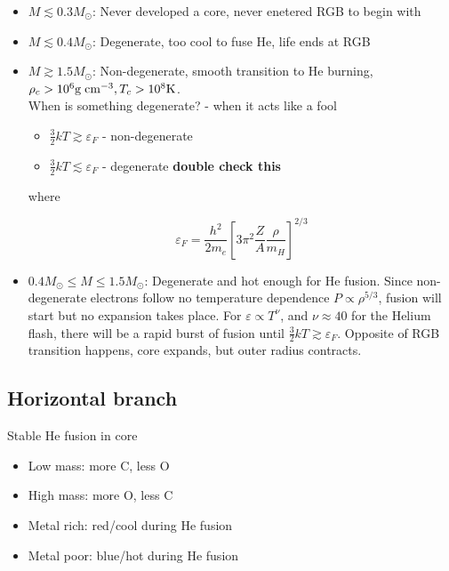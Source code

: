 \documentclass{article}
\begin{document}
\begin{itemize}
    \item $M \lesssim 0.3M_\odot$: Never developed a core, never enetered RGB to begin with
    \item $M \lesssim 0.4M_\odot$: Degenerate, too cool to fuse He, life ends at RGB
    \item $M \gtrsim 1.5M_\odot$: Non-degenerate, smooth transition to He burning, $\rho_c > 10^6 {\rm g\; cm^{-3}}, T_c > 10^8{\rm K}$.\\

    When is something degenerate? - when it acts like a fool\\

    \begin{itemize}
        \item $\frac{3}{2}kT \gtrsim \varepsilon_F$ - non-degenerate
        \item $\frac{3}{2}kT \lesssim \varepsilon_F$ - degenerate \textbf{double check this}
    \end{itemize}

    where 

    \begin{equation}
        \varepsilon_F = \frac{h^2}{2m_e}\left[3\pi^2\frac{Z}{A}\frac{\rho}{m_H}\right]^{2/3}
    \end{equation}

    \item $0.4M_\odot \leq M \leq 1.5M_\odot$: Degenerate and hot enough for He fusion. Since non-degenerate electrons follow no temperature dependence $P \propto \rho^{5/3}$, fusion will start but no expansion takes place. For $\varepsilon \propto T^\nu$, and $\nu \approx 40$ for the Helium flash, there will be a rapid burst of fusion until $\frac{3}{2}kT \gtrsim \varepsilon_F$. Opposite of RGB transition happens, core expands, but outer radius contracts.
\end{itemize}

\subsection{Horizontal branch}

Stable He fusion in core

\begin{itemize}
    \item Low mass: more C, less O
    \item High mass: more O, less C
    \item Metal rich: red/cool during He fusion
    \item Metal poor: blue/hot during He fusion
\end{itemize}
\end{document}
